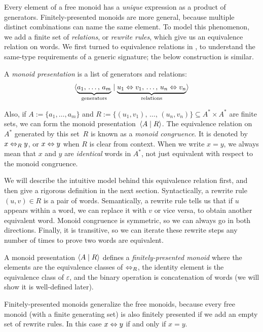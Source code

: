 \documentclass[../generics]{subfiles}
\begin{document}
Every element of a free monoid has a \emph{unique} expression as a product of generators. Finitely-presented monoids are more general, because multiple distinct combinations can name the same element. To model this phenomenon, we add a finite set of \emph{relations}, or \emph{rewrite rules}, which give us an equivalence relation on words. We first turned to equivalence relations in , to understand the same-type requirements of a generic signature; the below construction is similar.

A \emph{monoid presentation} is a list of generators and relations:
\[\langle  \underbrace{a_1,\,\ldots,\, a_m}_{\text{generators\vphantom{l}}}  \mid  \underbrace{u_1 \Leftrightarrow v_1,\,\ldots,\, u_n \Leftrightarrow v_n}_{\text{relations\vphantom{g}}}\rangle \]

Also, if $A := \{a_1,\ldots, a_m\}$ and $R := \{(u_1,v_1),\,\ldots,\,(u_n,v_n)\}\subseteq A^* \times A^*$ are finite sets, we can form the monoid presentation~$\langle A \mid R\rangle$. The equivalence relation on $A^*$ generated by this set~$R$ is known as a \emph{monoid congruence}. It is denoted by $x\Leftrightarrow_R y$, or $x \Leftrightarrow y$ when $R$ is clear from context. When we write $x=y$, we always mean that $x$ and $y$ are \emph{identical} words in $A^*$, not just equivalent with respect to the monoid congruence.

We will describe the intuitive model behind this equivalence relation first, and then give a rigorous definition in the next section. Syntactically, a rewrite rule $(u,v)\in R$ is a pair of words. Semantically, a rewrite rule tells us that if $u$ appears within a word, we can replace it with $v$ or vice versa, to obtain another equivalent word. Monoid congruence is symmetric, so we can always go in both directions. Finally, it is transitive, so we can iterate these rewrite steps any number of times to prove two words are equivalent.

A monoid presentation $\langle A \mid R\rangle$ defines a \emph{finitely-presented monoid} where the elements are the equivalence classes of $\Leftrightarrow_R$, the identity element is the equivalence class of $\varepsilon$, and the binary operation is concatenation of words (we will show it is well-defined later).

\begin{example}
Finitely-presented monoids generalize the free monoids, because every free monoid (with a finite generating set) is also finitely presented if we add an empty set of rewrite rules. In this case $x\Leftrightarrow y$ if and only if $x=y$.
\end{example}
\end{document}
